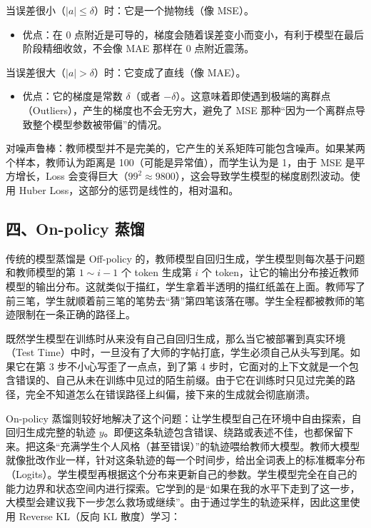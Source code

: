 当误差很小（\(|a| \le \delta\)）时：它是一个抛物线（像 MSE）。

\begin{itemize}
\tightlist
\item
  优点：在 0 点附近是可导的，梯度会随着误差变小而变小，有利于模型在最后阶段精细收敛，不会像 MAE 那样在 0 点附近震荡。
\end{itemize}

当误差很大（\(|a| > \delta\)）时：它变成了直线（像 MAE）。

\begin{itemize}
\tightlist
\item
  优点：它的梯度是常数 \(\delta\)（或者 \(-\delta\)）。这意味着即使遇到极端的离群点（Outliers），产生的梯度也不会无穷大，避免了 MSE 那种``因为一个离群点导致整个模型参数被带偏''的情况。
\end{itemize}

对噪声鲁棒：教师模型并不是完美的，它产生的关系矩阵可能包含噪声。如果某两个样本，教师认为距离是 100（可能是异常值），而学生认为是 1，由于 MSE 是平方增长，Loss 会变得巨大（\(99^2 \approx 9800\)），这会导致学生模型的梯度剧烈波动。使用 Huber Loss，这部分的惩罚是线性的，相对温和。

\hypertarget{ux56dbon-policy-ux84b8ux998f}{%
\subsection{四、On-policy 蒸馏}\label{ux56dbon-policy-ux84b8ux998f}}

传统的模型蒸馏是 Off-policy 的，教师模型自回归生成，学生模型则每次基于问题和教师模型的第 \(1 \sim i-1\) 个 token 生成第 \(i\) 个 token，让它的输出分布接近教师模型的输出分布。这就类似于描红，学生拿着半透明的描红纸盖在上面。教师写了前三笔，学生就顺着前三笔的笔势去``猜''第四笔该落在哪。学生全程都被教师的笔迹限制在一条正确的路径上。

既然学生模型在训练时从来没有自己自回归生成，那么当它被部署到真实环境（Test Time）中时，一旦没有了大师的字帖打底，学生必须自己从头写到尾。如果它在第 3 步不小心写歪了一点点，到了第 4 步时，它面对的上下文就是一个包含错误的、自己从未在训练中见过的陌生前缀。由于它在训练时只见过完美的路径，完全不知道怎么在错误路径上纠偏，接下来的生成就会彻底崩溃。

On-policy 蒸馏则较好地解决了这个问题：让学生模型自己在环境中自由探索，自回归生成完整的轨迹 \(y\)。即便这条轨迹包含错误、绕路或表述不佳，也都保留下来。把这条``充满学生个人风格（甚至错误）''的轨迹喂给教师大模型。教师大模型就像批改作业一样，针对这条轨迹的每一个时间步，给出全词表上的标准概率分布（Logits）。学生模型再根据这个分布来更新自己的参数。学生模型完全在自己的能力边界和状态空间内进行探索。它学到的是``如果在我的水平下走到了这一步，大模型会建议我下一步怎么救场或继续''。由于通过学生的轨迹采样，因此这里使用 Reverse KL（反向 KL 散度）学习：

